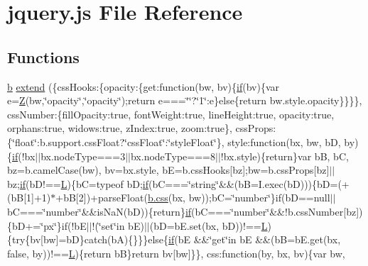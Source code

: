 \hypertarget{docs_2_programmer's_manual_2html_2jquery_8js}{}\section{jquery.\+js File Reference}
\label{docs_2_programmer's_manual_2html_2jquery_8js}
\subsection*{Functions}
\begin{DoxyCompactItemize}
\item 
\hyperlink{html_2jquery_8js_a2fa551895933fae935a0a6b87282241d}{b} \hyperlink{docs_2_programmer's_manual_2html_2jquery_8js_a5fb206c91c64d1be35fde236706eab86}{extend} (\{css\+Hooks\+:\{opacity\+:\{get\+:function(bw, bv)\{\hyperlink{html_2jquery_8js_a42cbfadee2b4749e8f699ea8d745a0e4}{if}(bv)\{var e=\hyperlink{html_2jquery_8js_adc18d83abfd9f87d396e8fd6b6ac0fe1}{Z}(bw,\char`\"{}opacity\char`\"{},\char`\"{}opacity\char`\"{});return e===\char`\"{}\char`\"{}?\char`\"{}1\char`\"{}\+:e\}else\{return bw.\+style.\+opacity\}\}\}\}, css\+Number\+:\{fill\+Opacity\+:true, font\+Weight\+:true, line\+Height\+:true, opacity\+:true, orphans\+:true, widows\+:true, z\+Index\+:true, zoom\+:true\}, css\+Props\+:\{\char`\"{}float\char`\"{}\+:b.\+support.\+css\+Float?\char`\"{}css\+Float\char`\"{}\+:\char`\"{}style\+Float\char`\"{}\}, style\+:function(bx, bw, b\+D, by)\{\hyperlink{html_2jquery_8js_a42cbfadee2b4749e8f699ea8d745a0e4}{if}(!bx$\vert$$\vert$bx.\+node\+Type===3$\vert$$\vert$bx.\+node\+Type===8$\vert$$\vert$!bx.\+style)\{return\}var b\+B, b\+C, bz=b.\+camel\+Case(bw), bv=bx.\+style, b\+E=b.\+css\+Hooks\mbox{[}bz\mbox{]};bw=b.\+css\+Props\mbox{[}bz\mbox{]}$\vert$$\vert$bz;\hyperlink{html_2jquery_8js_a42cbfadee2b4749e8f699ea8d745a0e4}{if}(b\+D!==\hyperlink{html_2jquery_8js_a38ee4c0b5f4fe2a18d0c783af540d253}{L})\{b\+C=typeof b\+D;\hyperlink{html_2jquery_8js_a42cbfadee2b4749e8f699ea8d745a0e4}{if}(b\+C===\char`\"{}string\char`\"{}\&\&(b\+B=I.\+exec(b\+D)))\{b\+D=(+(b\+B\mbox{[}1\mbox{]}+1)$\ast$+b\+B\mbox{[}2\mbox{]})+parse\+Float(\hyperlink{html_2jquery_8js_a89ad527fcd82c01ebb587332f5b4fcd4}{b.\+css}(bx, bw));b\+C=\char`\"{}number\char`\"{}\}if(b\+D==null$\vert$$\vert$b\+C===\char`\"{}number\char`\"{}\&\&is\+Na\+N(b\+D))\{return\}\hyperlink{html_2jquery_8js_a42cbfadee2b4749e8f699ea8d745a0e4}{if}(b\+C===\char`\"{}number\char`\"{}\&\&!b.\+css\+Number\mbox{[}bz\mbox{]})\{b\+D+=\char`\"{}px\char`\"{}\}if(!b\+E$\vert$$\vert$!(\char`\"{}set\char`\"{}in b\+E)$\vert$$\vert$(b\+D=b\+E.\+set(bx, b\+D))!==\hyperlink{html_2jquery_8js_a38ee4c0b5f4fe2a18d0c783af540d253}{L})\{try\{bv\mbox{[}bw\mbox{]}=b\+D\}catch(b\+A)\{\}\}\}else\{\hyperlink{html_2jquery_8js_a42cbfadee2b4749e8f699ea8d745a0e4}{if}(b\+E \&\&\char`\"{}get\char`\"{}in b\+E \&\&(b\+B=b\+E.\+get(bx, false, by))!==\hyperlink{html_2jquery_8js_a38ee4c0b5f4fe2a18d0c783af540d253}{L})\{return b\+B\}return bv\mbox{[}bw\mbox{]}\}\}, css\+:function(by, bx, bv)\{var bw, 
\end{DoxyCompactItemize}
